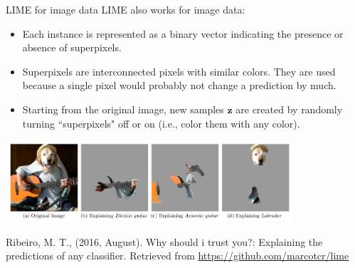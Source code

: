\documentclass[11pt,compress,t,notes=noshow, xcolor=table]{beamer}
\newcommand{\zv}{\mathbf{z}}
\begin{document}
	\begin{vbframe}{LIME for image data}
	LIME also works for image data:  
	\begin{itemize}
		\item Each instance is represented as a binary vector indicating the presence or absence of superpixels. 
		\item Superpixels are interconnected pixels with similar colors. They are used because a single pixel would probably not change a prediction by much.
		\item Starting from the original image, new samples $\zv$ are created by randomly turning ``superpixels" off or on (i.e., color them with any color). 
	\end{itemize}
	\vspace{-0.3cm}
	\begin{center}
		\includegraphics[width=0.8\textwidth]{figure/lime-images}
	\end{center}
	\vspace{-0.3cm}
	\tiny{Ribeiro, M. T., (2016, August). Why should i trust you?: Explaining the predictions of any classifier. Retrieved from \url{https://github.com/marcotcr/lime}\par}
\end{vbframe}
\end{document}
